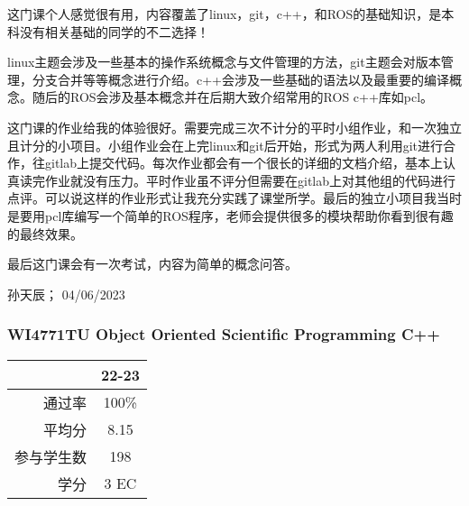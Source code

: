 这门课个人感觉很有用，内容覆盖了linux，git，c++，和ROS的基础知识，是本科没有相关基础的同学的不二选择！

linux主题会涉及一些基本的操作系统概念与文件管理的方法，git主题会对版本管理，分支合并等等概念进行介绍。c++会涉及一些基础的语法以及最重要的编译概念。随后的ROS会涉及基本概念并在后期大致介绍常用的ROS c++库如pcl。

这门课的作业给我的体验很好。需要完成三次不计分的平时小组作业，和一次独立且计分的小项目。小组作业会在上完linux和git后开始，形式为两人利用git进行合作，往gitlab上提交代码。每次作业都会有一个很长的详细的文档介绍，基本上认真读完作业就没有压力。平时作业虽不评分但需要在gitlab上对其他组的代码进行点评。可以说这样的作业形式让我充分实践了课堂所学。最后的独立小项目我当时是要用pcl库编写一个简单的ROS程序，老师会提供很多的模块帮助你看到很有趣的最终效果。

最后这门课会有一次考试，内容为简单的概念问答。
\begin{flushright}
孙天辰； 04/06/2023
\end{flushright}


\subsubsection{WI4771TU Object Oriented Scientific Programming C++}
\begin{minipage}{0.45\textwidth}
\centering
{}
\end{minipage}%
\begin{minipage}{0.45\textwidth}
\raggedleft
\begin{tabular}{r|c}
\textbf{ } & \textbf{22-23} \\ \hline
通过率 & 100\% \\ 
平均分 & 8.15 \\ 
参与学生数 & 198 \\
学分 & 3 EC\\
\end{tabular}
\end{minipage}\\

